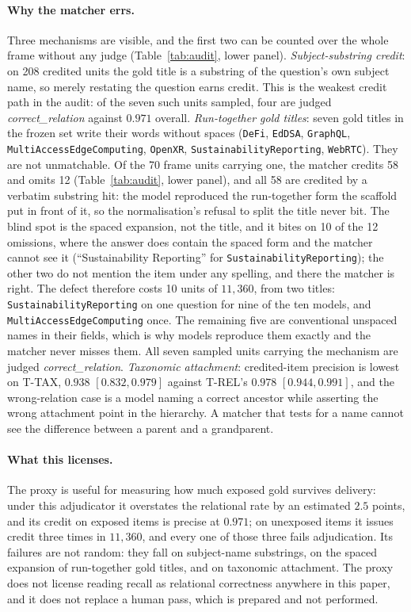 \documentclass[10pt,twocolumn]{article}
\begin{document}
\paragraph{Why the matcher errs.} Three mechanisms are visible, and the first two can be counted over the whole frame without any judge (Table~\ref{tab:audit}, lower panel). \emph{Subject-substring credit}: on 208 credited units the gold title is a substring of the question's own subject name, so merely restating the question earns credit. This is the weakest credit path in the audit: of the seven such units sampled, four are judged \emph{correct\_relation} against $0.971$ overall. \emph{Run-together gold titles}: seven gold titles in the frozen set write their words without spaces (\texttt{DeFi}, \texttt{EdDSA}, \texttt{GraphQL}, \texttt{MultiAccessEdgeComputing}, \texttt{OpenXR}, \texttt{SustainabilityReporting}, \texttt{WebRTC}). They are not unmatchable. Of the 70 frame units carrying one, the matcher credits 58 and omits 12 (Table~\ref{tab:audit}, lower panel), and all 58 are credited by a verbatim substring hit: the model reproduced the run-together form the scaffold put in front of it, so the normalisation's refusal to split the title never bit. The blind spot is the spaced expansion, not the title, and it bites on 10 of the 12 omissions, where the answer does contain the spaced form and the matcher cannot see it (``Sustainability Reporting'' for \texttt{SustainabilityReporting}); the other two do not mention the item under any spelling, and there the matcher is right. The defect therefore costs 10 units of $11{,}360$, from two titles: \texttt{SustainabilityReporting} on one question for nine of the ten models, and \texttt{MultiAccessEdgeComputing} once. The remaining five are conventional unspaced names in their fields, which is why models reproduce them exactly and the matcher never misses them. All seven sampled units carrying the mechanism are judged \emph{correct\_relation}. \emph{Taxonomic attachment}: credited-item precision is lowest on T-TAX, $0.938$ $[0.832,0.979]$ against T-REL's $0.978$ $[0.944,0.991]$, and the wrong-relation case is a model naming a correct ancestor while asserting the wrong attachment point in the hierarchy. A matcher that tests for a name cannot see the difference between a parent and a grandparent.

\paragraph{What this licenses.} The proxy is useful for measuring how much exposed gold survives delivery: under this adjudicator it overstates the relational rate by an estimated $2.5$ points, and its credit on exposed items is precise at $0.971$; on unexposed items it issues credit three times in $11{,}360$, and every one of those three fails adjudication. Its failures are not random: they fall on subject-name substrings, on the spaced expansion of run-together gold titles, and on taxonomic attachment. The proxy does not license reading recall as relational correctness anywhere in this paper, and it does not replace a human pass, which is prepared and not performed.
\end{document}
